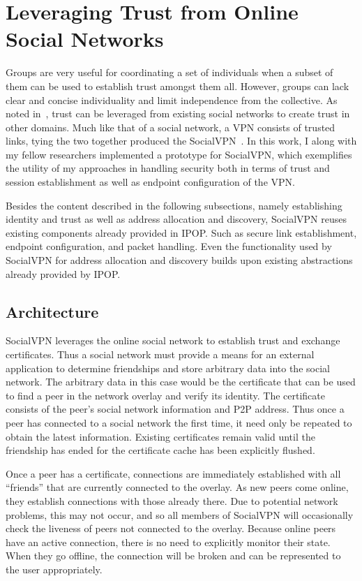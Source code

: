 \section{Leveraging Trust from Online Social Networks}

Groups are very useful for coordinating a set of individuals when a subset of
them can be used to establish trust amongst them all.  However, groups can lack
clear and concise individuality and limit independence from the collective.  As
noted in~\cite{socialvpn}, trust can be leveraged from existing social networks
to create trust in other domains.  Much like that of a social network, a VPN
consists of trusted links, tying the two together produced the
SocialVPN~\cite{socialvpn}.  In this work, I along with my fellow researchers
implemented a prototype for SocialVPN, which exemplifies the utility of my
approaches in handling security both in terms of trust and session
establishment as well as endpoint configuration of the VPN.

Besides the content described in the following subsections, namely establishing
identity and trust as well as address allocation and discovery, SocialVPN
reuses existing components already provided in IPOP.  Such as secure link
establishment, endpoint configuration, and packet handling.  Even the
functionality used by SocialVPN for address allocation and discovery builds
upon existing abstractions already provided by IPOP.

\subsection{Architecture}

SocialVPN leverages the online social network to establish trust and exchange
certificates.  Thus a social network must provide a means for an external
application to determine friendships and store arbitrary data into the social
network.  The arbitrary data in this case would be the certificate that can be
used to find a peer in the network overlay and verify its identity.  The
certificate consists of the peer's social network information and P2P address.
Thus once a peer has connected to a social network the first time, it need only
be repeated to obtain the latest information.  Existing certificates remain
valid until the friendship has ended for the certificate cache has been
explicitly flushed.

Once a peer has a certificate, connections are immediately established with all
``friends'' that are currently connected to the overlay.  As new peers come
online, they establish connections with those already there.  Due to potential
network problems, this may not occur, and so all members of SocialVPN will
occasionally check the liveness of peers not connected to the overlay.  Because
online peers have an active connection, there is no need to explicitly monitor
their state.  When they go offline, the connection will be broken and can be
represented to the user appropriately.

